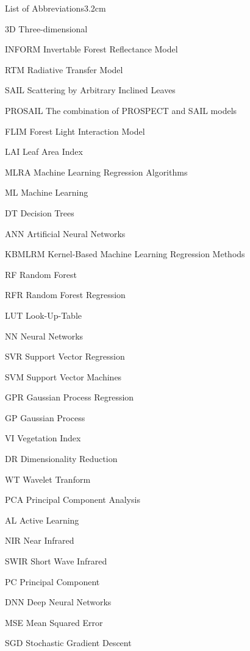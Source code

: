 \begin{mclistof}{List of Abbreviations}{3.2cm}

\item[3D] Three-dimensional
\item[INFORM] Invertable Forest Reflectance Model
\item[RTM] Radiative Transfer Model
\item[SAIL] Scattering by Arbitrary Inclined Leaves
\item[PROSAIL] The combination of PROSPECT and SAIL models
\item[FLIM] Forest Light Interaction Model
\item[LAI] Leaf Area Index
\item[MLRA] Machine Learning Regression Algorithms
\item[ML] Machine Learning
\item[DT] Decision Trees
\item[ANN] Artificial Neural Networks
\item[KBMLRM] Kernel-Based Machine Learning Regression Methods
\item[RF] Random Forest
\item[RFR] Random Forest Regression
\item[LUT] Look-Up-Table
\item[NN] Neural Networks
\item[SVR] Support Vector Regression
\item[SVM] Support Vector Machines
\item[GPR] Gaussian Process Regression
\item[GP] Gaussian Process
\item[VI] Vegetation Index
\item[DR] Dimensionality Reduction
\item[WT] Wavelet Tranform
\item[PCA] Principal Component Analysis
\item[AL] Active Learning
\item[NIR] Near Infrared
\item[SWIR] Short Wave Infrared
\item[PC] Principal Component
\item[DNN] Deep Neural Networks
\item[MSE] Mean Squared Error
\item[SGD] Stochastic Gradient Descent

\end{mclistof} 
